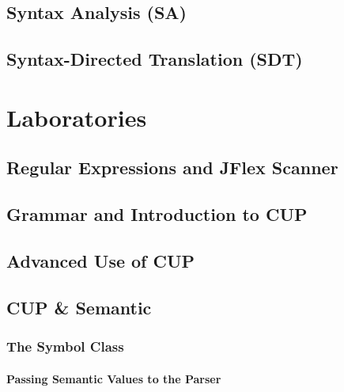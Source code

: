 \documentclass[pdfa,cucitura]{toptesi}
\begin{document}
\chapter{Syntax Analysis (SA)}


\chapter{Syntax-Directed Translation (SDT)}




\part{Laboratories}
\chapter{Regular Expressions and JFlex Scanner}


\chapter{Grammar and Introduction to CUP}


\chapter{Advanced Use of CUP}


\chapter{CUP \& Semantic}
\section{The Symbol Class}

\subsection{Passing Semantic Values to the Parser}
\end{document}
